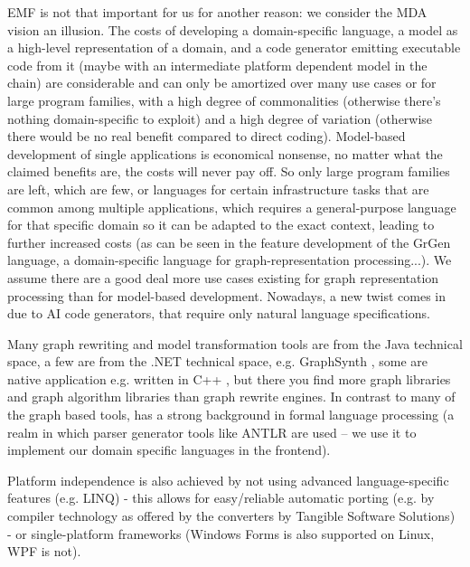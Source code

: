 EMF is not that important for us for another reason: we consider the MDA vision an illusion.
The costs of developing a domain-specific language, a model as a high-level representation of a domain, and a code generator emitting executable code from it (maybe with an intermediate platform dependent model in the chain) are considerable and can only be amortized over many use cases or for large program families, with a high degree of commonalities (otherwise there's nothing domain-specific to exploit) and a high degree of variation (otherwise there would be no real benefit compared to direct coding).
Model-based development of single applications is economical nonsense, no matter what the claimed benefits are, the costs will never pay off.
So only large program families are left, which are few, or languages for certain infrastructure tasks that are common among multiple applications, which requires a general-purpose language for that specific domain so it can be adapted to the exact context, leading to further increased costs (as can be seen in the feature development of the GrGen language, a domain-specific language for graph-representation processing...).
We assume there are a good deal more use cases existing for graph representation processing than for model-based development.
Nowadays, a new twist comes in due to AI code generators, that require only natural language specifications.

Many graph rewriting and model transformation tools are from the Java technical space, a few are from the .NET technical space, e.g. GraphSynth \cite{graphsynth}, some are native application e.g. written in C++ \cite{cplusplus}, but there you find more graph libraries and graph algorithm libraries than graph rewrite engines. %
In contrast to many of the graph based tools, \GrG{} has a strong background in formal language processing (a realm in which parser generator tools like ANTLR \cite{antlr} are used -- we use it to implement our domain specific languages in the frontend). %

Platform independence is also achieved by not using advanced language-specific features (e.g. LINQ)
- this allows for easy/reliable automatic porting (e.g. by compiler technology as offered by the converters by Tangible Software Solutions) %
- or single-platform frameworks (Windows Forms is also supported on Linux, WPF is not).

